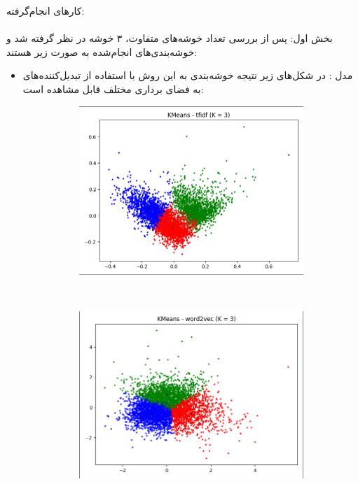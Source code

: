 \documentclass[11pt]{article}
\begin{document}
کارهای انجام‌گرفته: \\ \\
بخش اول: پس از بررسی تعداد خوشه‌های متفاوت، ۳ خوشه در نظر گرفته شد و خوشه‌بندی‌های انجام‌شده به صورت زیر هستند: \\
\begin{itemize}
\item
مدل  : در شکل‌های زیر نتیجه خوشه‌بندی به این روش با استفاده از تبدیل‌کننده‌های به فضای برداری مختلف قابل مشاهده است: \\
\begin{figure}[H]
\begin{center}
\begin{subfigure}{0.4\textwidth}
\includegraphics[width=\textwidth]{pics/kmeans_tfidf.png}
\caption{}
\end{subfigure}
~
\begin{subfigure}{0.4\textwidth}
\includegraphics[width=\textwidth]{pics/kmeans_w2v.png}
\caption{}
\end{subfigure}
\end{center}
\end{figure}


\end{itemize}
\end{document}
